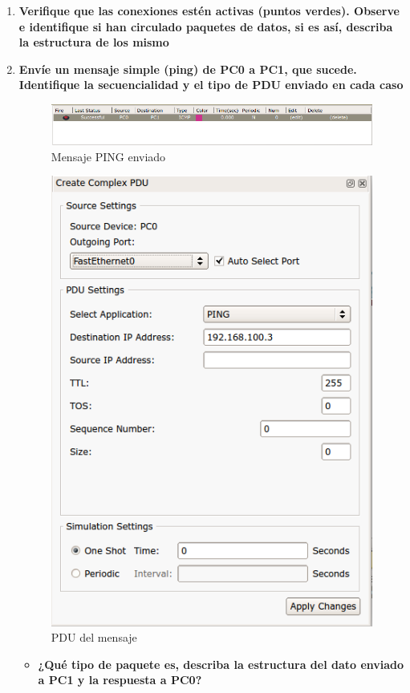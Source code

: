 \documentclass[a4paper,12pt]{article}
\begin{document}
\begin{enumerate}
 \item \textbf{Verifique que las conexiones estén activas (puntos verdes). Observe e identifique si han circulado paquetes de datos, si es así, describa la estructura de los mismo}
 \item \textbf{Envíe un mensaje simple (ping) de PC0 a PC1, que sucede. Identifique la secuencialidad y el tipo de PDU enviado en cada caso}
 \begin{figure}[H]
  \centering
  \includegraphics[scale = 0.5]{7.png}
  \caption{Mensaje PING enviado}
 \end{figure}
 \begin{figure}[H]
  \centering
  \includegraphics[scale = 0.5]{8.png}
  \caption{PDU del mensaje}
 \end{figure}
  \begin{itemize}
   \item \textbf{¿Qué tipo de paquete es, describa la estructura del dato enviado a PC1 y la respuesta a PC0?} \\

\end{itemize}
\end{enumerate}
\end{document}
